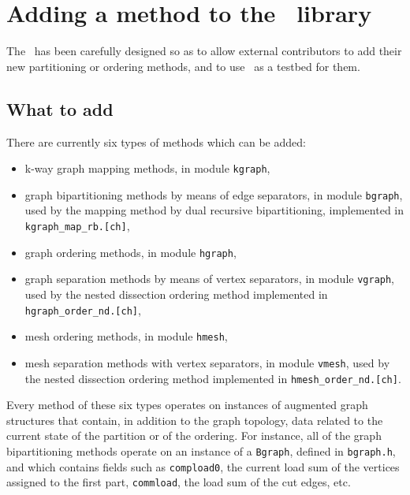
\section{Adding a method to the \libscotch\ library}
\label{sec-method}

The \libscotch\ has been carefully designed so as to allow external
contributors to add their new partitioning or ordering methods, and
to use \scotch\ as a testbed for them.

\subsection{What to add}

There are currently six types of methods which can be added:
\begin{itemize}
\item
k-way graph mapping methods, in module {\tt kgraph},
\item
graph bipartitioning methods by means of edge separators, in module
{\tt bgraph}, used by the mapping method by dual recursive
bipartitioning, implemented in {\tt kgraph\_\lbt map\_\lbt rb.[ch]},
\item
graph ordering methods, in module {\tt hgraph},
\item
graph separation methods by means of vertex separators, in module
{\tt vgraph}, used by the nested dissection ordering method
implemented in {\tt hgraph\_\lbt order\_\lbt nd.[ch]},
\item
mesh ordering methods, in module {\tt hmesh},
\item
mesh separation methods with vertex separators, in module
{\tt vmesh}, used by the nested dissection ordering method
implemented in {\tt hmesh\_\lbt order\_\lbt nd.[ch]}.
\end{itemize}
Every method of these six types operates on instances of augmented
graph structures that contain, in addition to the graph topology,
data related to the current state of the partition or of the
ordering. For instance, all of the graph bipartitioning methods
operate on an instance of a {\tt Bgraph}, defined in {\tt bgraph.h},
and which contains fields such as {\tt compload0}, the current load
sum of the vertices assigned to the first part, {\tt commload}, the
load sum of the cut edges, etc.

